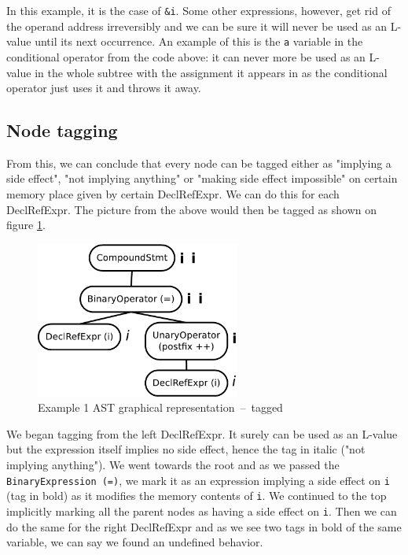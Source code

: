 In this example, it is the case of \verb|&i|. Some other expressions, however, get rid of the operand address irreversibly and we can be sure it will never be used as an L-value until its next occurrence. An example of this is the \verb|a| variable in the conditional operator from the code above: it can never more be used as an L-value in the whole subtree with the assignment it appears in as the conditional operator just uses it and throws it away.

\subsection{Node tagging}
From this, we can conclude that every node can be tagged either as "implying a side effect", "not implying anything" or "making side effect impossible" on certain memory place given by certain DeclRefExpr. We can do this for each DeclRefExpr. The picture from the above would then be tagged as shown on figure \ref{ASTtagged}.
\begin{figure}
    \caption{Example 1 AST graphical representation~--~tagged}
    \label{ASTtagged}
    \centering
        \includegraphics[width=0.6\textwidth]{fig/example1G-tagged.pdf}
\end{figure}

We began tagging from the left DeclRefExpr. It surely can be used as an L-value but the expression itself implies no side effect, hence the tag in italic ("not implying anything"). We went towards the root and as we passed the \verb|BinaryExpression (=)|, we mark it as an expression implying a side effect on \verb|i| (tag in bold) as it modifies the memory contents of \verb|i|. We continued to the top implicitly marking all the parent nodes as having a side effect on \verb|i|. Then we can do the same for the right DeclRefExpr and as we see two tags in bold of the same variable, we can say we found an undefined behavior.

